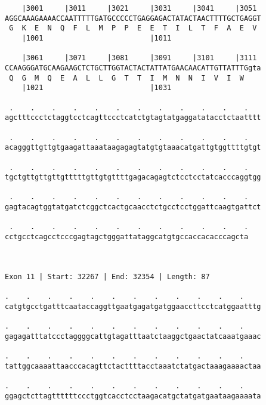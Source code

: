 \documentclass{article}
\begin{document}
\begin{Verbatim}
    |3001     |3011     |3021     |3031     |3041     |3051 
AGGCAAAGAAAACCAATTTTTGATGCCCCCTGAGGAGACTATACTAACTTTTGCTGAGGT
 G  K  E  N  Q  F  L  M  P  P  E  E  T  I  L  T  F  A  E  V 
    |1001                         |1011                     
  
    |3061     |3071     |3081     |3091     |3101     |3111 
CCAAGGGATGCAAGAAGCTCTGCTTGGTACTACTATTATGAACAACATTGTTATTTGgta
 Q  G  M  Q  E  A  L  L  G  T  T  I  M  N  N  I  V  I  W    
    |1021                         |1031                     
  
 .    .    .    .    .    .    .    .    .    .    .    .   
agctttccctctaggtcctcagttccctcatctgtagtatgaggatatacctctaatttt
                                                            
 .    .    .    .    .    .    .    .    .    .    .    .   
acagggttgttgtgaagattaaataagagagtatgtgtaaacatgattgtggttttgtgt
                                                            
 .    .    .    .    .    .    .    .    .    .    .    .   
tgctgttgttgttgtttttgttgtgttttgagacagagtctcctcctatcacccaggtgg
                                                            
 .    .    .    .    .    .    .    .    .    .    .    .   
gagtacagtggtatgatctcggctcactgcaacctctgcctcctggattcaagtgattct
                                                            
 .    .    .    .    .    .    .    .    .    .    .    .
cctgcctcagcctcccgagtagctgggattataggcatgtgccaccacacccagcta
                                                         
                                                         
 
Exon 11 | Start: 32267 | End: 32354 | Length: 87
 
.    .    .    .    .    .    .    .    .    .    .    .    
catgtgcctgatttcaataccaggttgaatgagatgatggaaccttcctcatggaatttg
                                                            
.    .    .    .    .    .    .    .    .    .    .    .    
gagagatttatccctaggggcattgtagatttaatctaaggctgaactatcaaatgaaac
                                                            
.    .    .    .    .    .    .    .    .    .    .    .    
tattggcaaaattaacccacagttctacttttacctaaatctatgactaaagaaaactaa
                                                            
.    .    .    .    .    .    .    .    .    .    .    .    
ggagctcttagttttttccctggtcacctcctaagacatgctatgatgaataagaaaata
                                                            

\end{Verbatim}
\end{document}
